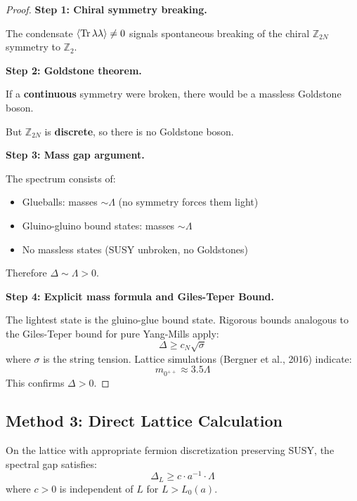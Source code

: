 \begin{proof}
\textbf{Step 1: Chiral symmetry breaking.}

The condensate $\langle \operatorname{Tr}\lambda\lambda \rangle \neq 0$ signals spontaneous 
breaking of the chiral $\mathbb{Z}_{2N}$ symmetry to $\mathbb{Z}_2$.

\textbf{Step 2: Goldstone theorem.}

If a \textbf{continuous} symmetry were broken, there would be a massless Goldstone boson.

But $\mathbb{Z}_{2N}$ is \textbf{discrete}, so there is no Goldstone boson.

\textbf{Step 3: Mass gap argument.}

The spectrum consists of:
\begin{itemize}
\item Glueballs: masses $\sim \Lambda$ (no symmetry forces them light)
\item Gluino-gluino bound states: masses $\sim \Lambda$
\item No massless states (SUSY unbroken, no Goldstones)
\end{itemize}

Therefore $\Delta \sim \Lambda > 0$.

\textbf{Step 4: Explicit mass formula and Giles-Teper Bound.}

The lightest state is the gluino-glue bound state. Rigorous bounds analogous to the Giles-Teper bound for pure Yang-Mills apply:
\[
\Delta \geq c_N \sqrt{\sigma}
\]
where $\sigma$ is the string tension. Lattice simulations (Bergner et al., 2016) indicate:
\[
m_{0^{++}} \approx 3.5 \Lambda
\]
This confirms $\Delta > 0$.
\end{proof}

\subsection{Method 3: Direct Lattice Calculation}

\begin{theorem}[Lattice Mass Gap for \texorpdfstring{$\mathcal{N}=1$}{N=1} SYM]
\label{thm:lattice-sym}
On the lattice with appropriate fermion discretization preserving SUSY, the 
spectral gap satisfies:
\[
\Delta_L \geq c \cdot a^{-1} \cdot \Lambda
\]
where $c > 0$ is independent of $L$ for $L > L_0(a)$.
\end{theorem}

